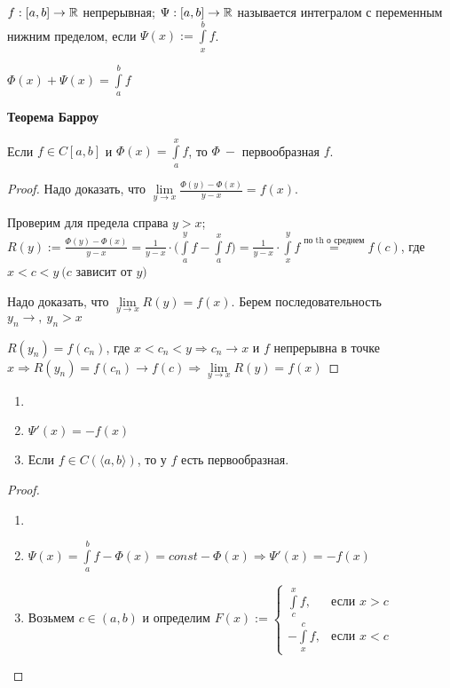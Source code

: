 \begin{definition}
    $f:[a,b]\rightarrow \mathbb{R}$ непрерывная; $\Psi:[a,b]\rightarrow \mathbb{R}$ называется интегралом с переменным нижним пределом, если $\Psi(x):=\int\limits_x^b f$.
\end{definition}

\begin{remark}
    $\Phi(x)+\Psi(x)=\int\limits_a^b f$
\end{remark}

\begin{theorem}
    \textbf{Теорема Барроу}

    Если $f\in C[a,b]$ и $\Phi(x)=\int\limits_a^x f$, то $\Phi\ -$ первообразная $f$.
\end{theorem}

\begin{proof}
    Надо доказать, что $\lim \limits_{y\rightarrow x}\frac{\Phi(y)-\Phi(x)}{y-x}=f(x)$.

    Проверим для предела справа $y>x$; $R(y):=\frac{\Phi(y)-\Phi(x)}{y-x}=\frac{1}{y-x}\cdot \bigg(\int\limits_a^y f - \int\limits_a^x f \bigg)=\frac{1}{y-x}\cdot \int\limits_x^y f\overset{\text{по th о среднем}}{=} f(c)$, где $x<c<y\ (c$ зависит от $y)$

    Надо доказать, что $\lim\limits_{y\rightarrow x} R(y)=f(x)$. Берем последовательность $y_n\rightarrow,\ y_n>x$

    $R(y_n)=f(c_n)$, где $x<c_n<y\Rightarrow c_n\rightarrow x$ и $f$ непрерывна в точке $x\Rightarrow R(y_n)=f(c_n)\rightarrow f(c)\Rightarrow \lim\limits_{y\rightarrow x} R(y)=f(x)$
\end{proof}

\begin{corollary}
    \begin{enumerate}
        \item[]
        \item $\Psi'(x)=-f(x)$
        \item Если $f\in C(\langle a,b \rangle)$, то у $f$ есть первообразная.
    \end{enumerate}
\end{corollary}

\begin{proof}
    \begin{enumerate}
        \item[]
        \item $\Psi(x)=\int\limits_a^b f-\Phi(x)=const -\Phi(x)\Rightarrow \Psi'(x)=-f(x)$
        \item Возьмем $c\in (a,b)$ и определим $F(x):=\begin{cases} \int\limits_c^x f, &\text{если $x>c$} \\
        -\int\limits_x^c f, &\text{если $x<c$}
        \end{cases}$
    \end{enumerate}
\end{proof}

